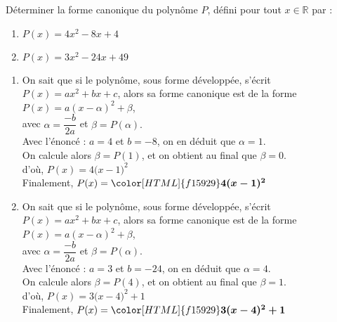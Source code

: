 \documentclass[a4paper,11pt,exos]{nsi} %
\begin{document}
\maketitle




\begin{exercice}
    Déterminer la forme canonique du polynôme $P$, défini pour tout $x \in \mathbb{R}$ par : 
    \begin{multicols}{2}
        \begin{enumerate}
            \item $P(x)=4x^2-8x+4$
            \item $P(x)=3x^2-24x+49$
        \end{enumerate}
    \end{multicols}
\end{exercice}



\begin{enumerate}[itemsep=1em]
    \item On sait que si le polynôme, sous forme développée, s'écrit $P(x)=ax^2+bx+c$, alors sa forme canonique est de la forme $P(x)=a(x-\alpha)^2+\beta$,\\avec $\alpha=\dfrac{-b}{2a}$ et $\beta=P(\alpha).$\\Avec l'énoncé : $a=4$ et $b=-8$, on en déduit que $\alpha=1$.\\On calcule alors $\beta=P(1)$, et on obtient au final que $\beta=0$.\\d'où, $P(x)=4\big(x-1\big)^2$\\Finalement, $P(x)={\color[HTML]{f15929}\boldsymbol{4(x -1)^2}}$
    
    \item On sait que si le polynôme, sous forme développée, s'écrit $P(x)=ax^2+bx+c$, alors sa forme canonique est de la forme $P(x)=a(x-\alpha)^2+\beta$,\\avec $\alpha=\dfrac{-b}{2a}$ et $\beta=P(\alpha).$\\Avec l'énoncé : $a=3$ et $b=-24$, on en déduit que $\alpha=4$.\\On calcule alors $\beta=P(4)$, et on obtient au final que $\beta=1$.\\d'où, $P(x)=3\big(x-4\big)^2+1$\\Finalement, $P(x)={\color[HTML]{f15929}\boldsymbol{3(x -4)^2+1}}$
    
\end{enumerate}
    
    
\end{document}
